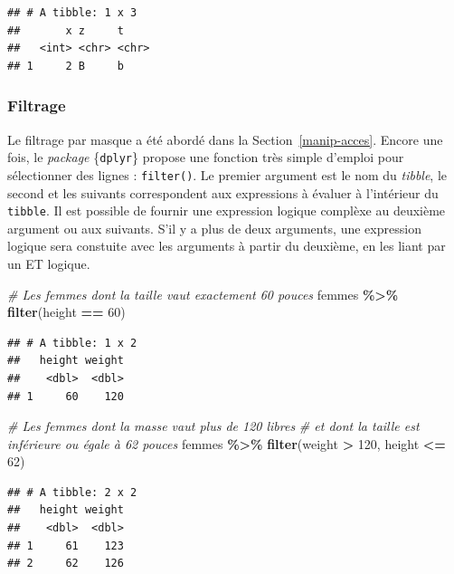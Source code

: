 \documentclass[
  11pt,
]{book}
\newenvironment{Shaded}{\begin{snugshade}}{\end{snugshade}}
\newcommand{\CommentTok}[1]{\textcolor[rgb]{0.56,0.35,0.01}{\textit{#1}}}
\newcommand{\DecValTok}[1]{\textcolor[rgb]{0.00,0.00,0.81}{#1}}
\newcommand{\KeywordTok}[1]{\textcolor[rgb]{0.13,0.29,0.53}{\textbf{#1}}}
\newcommand{\NormalTok}[1]{#1}
\newcommand{\OperatorTok}[1]{\textcolor[rgb]{0.81,0.36,0.00}{\textbf{#1}}}
\newcommand{\StringTok}[1]{\textcolor[rgb]{0.31,0.60,0.02}{#1}}
\numberwithin{equation}{section}
\numberwithin{countremarque}{section}
\begin{document}
\begin{lstlisting}
## # A tibble: 1 x 3
##       x z     t    
##   <int> <chr> <chr>
## 1     2 B     b
\end{lstlisting}

\hypertarget{filtrage}{%
\subsubsection{Filtrage}\label{filtrage}}

Le filtrage par masque a été abordé dans la Section~\ref{manip-acces}. Encore une fois, le \emph{package} \{\texttt{dplyr}\} propose une fonction très simple d'emploi pour sélectionner des lignes : \texttt{filter()}. Le premier argument est le nom du \emph{tibble}, le second et les suivants correspondent aux expressions à évaluer à l'intérieur du \texttt{tibble}. Il est possible de fournir une expression logique complèxe au deuxième argument ou aux suivants. S'il y a plus de deux arguments, une expression logique sera constuite avec les arguments à partir du deuxième, en les liant par un ET logique.

\begin{Shaded}
\begin{Highlighting}[]
\CommentTok{\# Les femmes dont la taille vaut exactement 60 pouces}
\NormalTok{femmes }\OperatorTok{\%\textgreater{}\%}\StringTok{ }
\StringTok{  }\KeywordTok{filter}\NormalTok{(height }\OperatorTok{==}\StringTok{ }\DecValTok{60}\NormalTok{)}
\end{Highlighting}
\end{Shaded}

\begin{lstlisting}
## # A tibble: 1 x 2
##   height weight
##    <dbl>  <dbl>
## 1     60    120
\end{lstlisting}

\begin{Shaded}
\begin{Highlighting}[]
\CommentTok{\# Les femmes dont la masse vaut plus de 120 libres}
\CommentTok{\# et dont la taille est inférieure ou égale à 62 pouces}
\NormalTok{femmes }\OperatorTok{\%\textgreater{}\%}\StringTok{ }
\StringTok{  }\KeywordTok{filter}\NormalTok{(weight }\OperatorTok{\textgreater{}}\StringTok{ }\DecValTok{120}\NormalTok{, height }\OperatorTok{\textless{}=}\StringTok{ }\DecValTok{62}\NormalTok{)}
\end{Highlighting}
\end{Shaded}

\begin{lstlisting}
## # A tibble: 2 x 2
##   height weight
##    <dbl>  <dbl>
## 1     61    123
## 2     62    126
\end{lstlisting}
\end{document}
